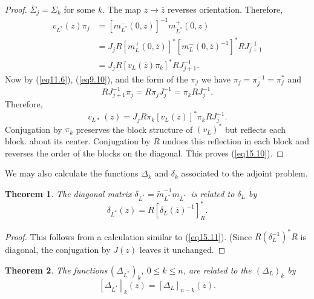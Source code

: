 \documentclass{surv-l}
\theoremstyle{plain}
\newtheorem{theorem}{Theorem}[section]
\theoremstyle{definition}
\numberwithin{equation}{chapter}
\begin{document}
\begin{proof}
$\overline{\Sigma}_{j}=\Sigma_{k}$ for some $k$. The map $z\rightarrow\overline{z}$ reverses orientation. Therefore,
\begin{align}\label{eq15.11}
v_{L^{*}}(z)\pi_{j}&=[m_{L^{*}}^{-}(0, z)]^{-1}m_{L^{*}}^{+}(0,z)\\ \nonumber
&=J_{j}R[m_{L}^{+}(0,\overline{z})]^{*}[m_{L}^{-}(0, \overline{z})^{-1}]^{*}RJ_{j+1}^{-1}\\
&=J_{j}R[v_{L}(\overline{z})\pi_{k}]^{*}RJ_{j+1}^{-1}. \nonumber
\end{align}
Now by (\ref{eq11.6}), (\ref{eq9.10}), and the form of the $\pi_{j}$ we have $\pi_{j}=\pi_{j}^{-1}=\pi_{j}^{*}$ and
\begin{equation*}
RJ_{j+1}^{-1}\pi_{j}=R\pi_{j}J_{j}^{-1}=\pi_{k}RJ_{j}^{-1}.
\end{equation*}
Therefore,
\setcounter{equation}{11}
\begin{equation}\label{eq15.12}
v_{L*}\, (z)=J_{j}R\pi_{k}[v_{L}(\overline{z})]^{*}\pi_{k}RJ_{j}^{-1}.
\end{equation}
Conjugation by $\pi_{k}$ preserves the block structure of $(v_{L})^{*}$ but reflects each block. about its center. Conjugation by $R$ undoes this reflection in each block and reverses the order of the blocks on the diagonal. This proves (\ref{eq15.10}).
\end{proof}
We may also calculate the functions $\Delta_{k}$ and $\delta_{k}$ associated to the adjoint problem.
\setcounter{theorem}{12}
\begin{theorem}\label{thm15.13}
The diagonal matrix $\delta_{L^{*}}=\tilde{m}_{L^{*}}^{-1}m_{L^{*}}$\, is related to $\delta_{L}$  by
\setcounter{equation}{13}
\begin{equation}\label{eq15.14}
\delta_{L^{*}} (z)=R[\delta_{L}(\overline{z})^{-1}]_{R}^{*}.
\end{equation}
\end{theorem}

\begin{proof}
This follows from a calculation similar to (\ref{eq15.11}). (Since $R(\delta_{L}^{-1})^{*}R$ is diagonal, the conjugation by $J(z)$ leaves it unchanged.
\end{proof}
\setcounter{theorem}{14}
\begin{theorem}\label{thm15.15}
The functions\,$(\Delta_{{{L}}^{{\ast}}})_{k},\ 0\leq k\leq n$,  are related to  the $(\Delta_{L})_{k}$ by
\setcounter{equation}{15}
\begin{equation}\label{eq15.16}
[\Delta_{L^{*}}]_{k}(z)=\overline{[\Delta_{L}]_{n-k}(\overline{z})}.
\end{equation}

\end{theorem}
\end{document}
